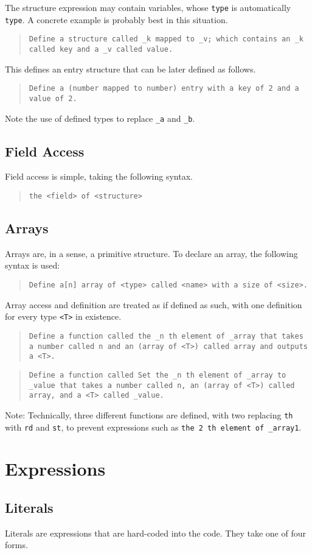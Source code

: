 \documentclass{article}
\newcommand{\code}[1]{\texttt{#1}}
\newcommand{\codeblock}[1]{\begin{quote}\code{#1}\end{quote}}
\begin{document}
The structure expression may contain variables, whose \code{type} is automatically \code{type}. A concrete example is probably best in this situation.

\codeblock{Define a structure called \_{}k mapped to \_{}v; which contains an \_{k} called key and a \_{v} called value.}

This defines an entry structure that can be later defined as follows.

\codeblock{Define a (number mapped to number) entry with a key of 2 and a value of 2.}

Note the use of defined types to replace \code{\_{a}} and \code{\_{b}}.

\subsection{Field Access}

Field access is simple, taking the following syntax.

\codeblock{the <field> of <structure>}

\subsection{Arrays}
Arrays are, in a sense, a primitive structure. To declare an array, the following syntax is used:

\codeblock{Define a[n] array of <type> called <name> with a size of <size>.}

Array access and definition are treated as if defined as such, with one definition for every type \code{<T>} in existence.

\codeblock{Define a function called the \_{n} th element of \_{array} that takes a number called n and an (array of <T>) called array and outputs a <T>.}

\codeblock{Define a function called Set the \_{n} th element of \_{array} to \_{value} that takes a number called n, an (array of <T>) called array, and a <T> called \_{}value.}

Note: Technically, three different functions are defined, with two replacing \code{th} with \code{rd} and \code{st}, to prevent expressions such as \code{the 2 th element of \_{}array1}.

\section{Expressions}
\subsection{Literals}
Literals are expressions that are hard-coded into the code. They take one of four forms.
\end{document}
